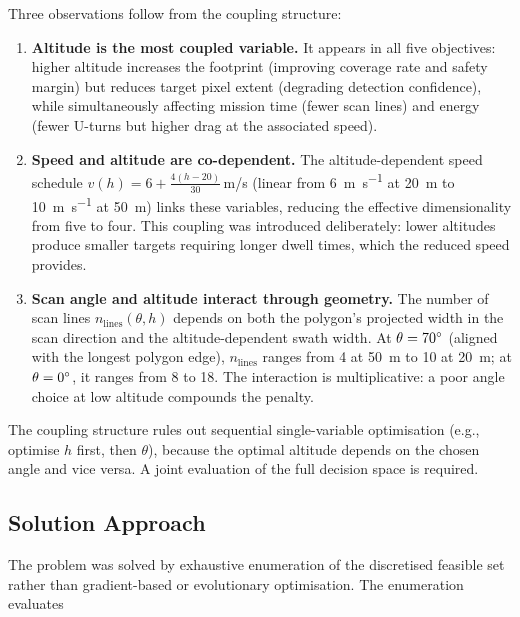 \noindent Three observations follow from the coupling structure:

\begin{enumerate}
  \item \textbf{Altitude is the most coupled variable.} It appears in all five objectives: higher altitude increases the footprint (improving coverage rate and safety margin) but reduces target pixel extent (degrading detection confidence), while simultaneously affecting mission time (fewer scan lines) and energy (fewer U-turns but higher drag at the associated speed).

  \item \textbf{Speed and altitude are co-dependent.} The altitude-dependent speed schedule $v(h) = 6 + \tfrac{4(h - 20)}{30}$\,m/s (linear from \SI{6}{\metre\per\second} at \SI{20}{\metre} to \SI{10}{\metre\per\second} at \SI{50}{\metre}) links these variables, reducing the effective dimensionality from five to four. This coupling was introduced deliberately: lower altitudes produce smaller targets requiring longer dwell times, which the reduced speed provides.

  \item \textbf{Scan angle and altitude interact through geometry.} The number of scan lines $n_{\mathrm{lines}}(\theta, h)$ depends on both the polygon's projected width in the scan direction and the altitude-dependent swath width. At $\theta = 70\degree$ (aligned with the longest polygon edge), $n_{\mathrm{lines}}$ ranges from 4 at \SI{50}{\metre} to 10 at \SI{20}{\metre}; at $\theta = 0\degree$, it ranges from 8 to 18. The interaction is multiplicative: a poor angle choice at low altitude compounds the penalty.
\end{enumerate}

\noindent The coupling structure rules out sequential single-variable optimisation (e.g., optimise $h$ first, then $\theta$), because the optimal altitude depends on the chosen angle and vice versa. A joint evaluation of the full decision space is required.

\subsection{Solution Approach}\label{sec:solution-approach}

The problem was solved by exhaustive enumeration of the discretised feasible set rather than gradient-based or evolutionary optimisation. The enumeration evaluates

